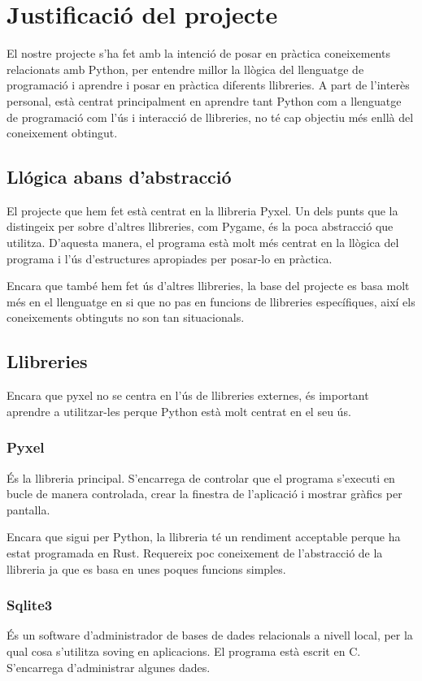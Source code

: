 \section{Justificaci\'o del projecte}
El nostre projecte s'ha fet amb la intenci\'o de
posar en pr\`actica coneixements relacionats amb Python,
per entendre millor la ll\`ogica del llenguatge de programaci\'o
i aprendre i posar en pr\`actica diferents llibreries.
A part de l'inter\`es personal, est\`a centrat principalment en aprendre tant
Python com a llenguatge de programaci\'o com l'\'us i interacci\'o de llibreries,
no t\'e cap objectiu m\'es enll\`a del coneixement obtingut.


\subsection{Ll\'ogica abans d'abstracci\'o}
El projecte que hem fet est\`a centrat en la llibreria Pyxel.
Un dels punts que la distingeix per sobre d'altres llibreries, com Pygame,
\'es la poca abstracci\'o que utilitza.
D'aquesta manera, el programa est\`a molt m\'es centrat en la ll\`ogica
del programa i l'\'us d'estructures apropiades per posar-lo en pr\`actica.

Encara que tamb\'e hem fet \'us d'altres llibreries,
la base del projecte es basa molt m\'es en el llenguatge en si que
no pas en funcions de llibreries espec\'ifiques,
aix\'i els coneixements obtinguts no son tan situacionals.


\subsection{Llibreries}
Encara que pyxel no se centra en l'\'us de llibreries externes,
\'es important aprendre a utilitzar-les
perque Python est\`a molt centrat en el seu \'us.

\subsubsection{Pyxel}
\'Es la llibreria principal.
S'encarrega de controlar que el programa s'executi en bucle de manera controlada,
crear la finestra de l'aplicaci\'o i mostrar gr\`afics per pantalla.

Encara que sigui per Python, la llibreria t\'e un rendiment acceptable
perque ha estat programada en Rust.
Requereix poc coneixement de l'abstracci\'o de la llibreria
ja que es basa en unes poques funcions simples.

\subsubsection{Sqlite3}
\'Es un software d'administrador de bases de dades relacionals a nivell local,
per la qual cosa s'utilitza soving en aplicacions. El programa est\`a escrit en C.
S'encarrega d'administrar algunes dades.

